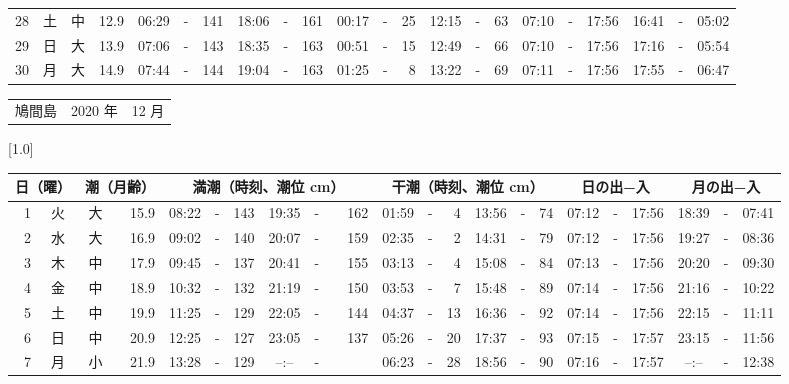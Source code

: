 \documentclass[12pt,a4j]{jsarticle}
\begin{document}
\begin{table}[htbp]
\begin{center}
{\begin{tabular}{|rc|cr|ccrccr|ccrccr|ccc|ccc|}
28 & 土 & 中 & 12.9 &  06:29 &-& 141 &  18:06 &-& 161 &  00:17 &-&  25 &  12:15 &-&  63 & 07:10 & -& 17:56 & 16:41 & -& 05:02 \\
29 & 日 & 大 & 13.9 &  07:06 &-& 143 &  18:35 &-& 163 &  00:51 &-&  15 &  12:49 &-&  66 & 07:10 & -& 17:56 & 17:16 & -& 05:54 \\
30 & 月 & 大 & 14.9 &  07:44 &-& 144 &  19:04 &-& 163 &  01:25 &-&   8 &  13:22 &-&  69 & 07:11 & -& 17:56 & 17:55 & -& 06:47 \\
   \hline
   \end{tabular}}
   \end{center}
\end{table}
\newpage
 \begin{table}[htbp]
 \begin{center}
 \begin{tabular}{lcc}
 \LARGE{鳩間島}  & \large{2020 年} & \large{12 月} \\
 \end{tabular}
 \end{center}
 \begin{center}
    \scalebox{0.7}[1.0]{
    \begin{tabular}{|rc|cr|ccrccr|ccrccr|ccc|ccc|}
    \hline
    \multicolumn{2}{|c|}{日（曜）} & \multicolumn{2}{c|}{潮（月齢）} & \multicolumn{6}{c|}{満潮（時刻、潮位 cm）} & \multicolumn{6}{c|}{干潮（時刻、潮位 cm）} & \multicolumn{3}{c|}{日の出−入} &  \multicolumn{3}{c|}{月の出−入}\\
 \hline
 1 & 火 & 大 & 15.9 &  08:22 &-& 143 &  19:35 &-& 162 &  01:59 &-&   4 &  13:56 &-&  74 & 07:12 & -& 17:56 & 18:39 & -& 07:41 \\
 2 & 水 & 大 & 16.9 &  09:02 &-& 140 &  20:07 &-& 159 &  02:35 &-&   2 &  14:31 &-&  79 & 07:12 & -& 17:56 & 19:27 & -& 08:36 \\
 3 & 木 & 中 & 17.9 &  09:45 &-& 137 &  20:41 &-& 155 &  03:13 &-&   4 &  15:08 &-&  84 & 07:13 & -& 17:56 & 20:20 & -& 09:30 \\
 4 & 金 & 中 & 18.9 &  10:32 &-& 132 &  21:19 &-& 150 &  03:53 &-&   7 &  15:48 &-&  89 & 07:14 & -& 17:56 & 21:16 & -& 10:22 \\
 5 & 土 & 中 & 19.9 &  11:25 &-& 129 &  22:05 &-& 144 &  04:37 &-&  13 &  16:36 &-&  92 & 07:14 & -& 17:56 & 22:15 & -& 11:11 \\
 6 & 日 & 中 & 20.9 &  12:25 &-& 127 &  23:05 &-& 137 &  05:26 &-&  20 &  17:37 &-&  93 & 07:15 & -& 17:57 & 23:15 & -& 11:56 \\
 7 & 月 & 小 & 21.9 &  13:28 &-& 129 &  --:-- &-&~~~~~ &  06:23 &-&  28 &  18:56 &-&  90 & 07:16 & -& 17:57 & --:-- & -& 12:38 \\

\end{tabular}}
\end{center}
\end{table}
\end{document}
